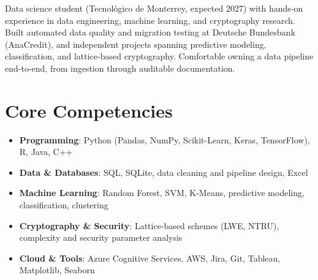 \documentclass[11pt,a4paper,sans]{moderncv}
\begin{document}
\makecvtitle


\vspace{6pt}
\small{Data science student (Tecnológico de Monterrey, expected 2027) with hands-on experience in data engineering, machine learning, and cryptography research. Built automated data quality and migration testing at Deutsche Bundesbank (AnaCredit), and independent projects spanning predictive modeling, classification, and lattice-based cryptography. Comfortable owning a data pipeline end-to-end, from ingestion through auditable documentation.}


\section{Core Competencies}
\vspace{1pt}
\begin{itemize}

\item \textbf{Programming}: Python (Pandas, NumPy, Scikit-Learn, Keras, TensorFlow), R, Java, C++

\item \textbf{Data \& Databases}: SQL, SQLite, data cleaning and pipeline design, Excel

\item \textbf{Machine Learning}: Random Forest, SVM, K-Means, predictive modeling, classification, clustering

\item \textbf{Cryptography \& Security}: Lattice-based schemes (LWE, NTRU), complexity and security parameter analysis

\item \textbf{Cloud \& Tools}: Azure Cognitive Services, AWS, Jira, Git, Tableau, Matplotlib, Seaborn

\end{itemize}

\end{document}
